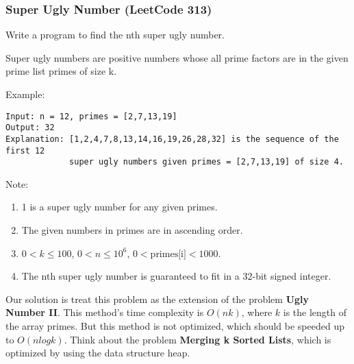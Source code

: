 \documentclass[11pt]{article}
\begin{document}
\subsubsection{Super Ugly Number (LeetCode 313)}
Write a program to find the nth super ugly number.

Super ugly numbers are positive numbers whose all prime factors are in the given prime list primes of size k.

Example:
\begin{verbatim}
Input: n = 12, primes = [2,7,13,19]
Output: 32 
Explanation: [1,2,4,7,8,13,14,16,19,26,28,32] is the sequence of the first 12 
             super ugly numbers given primes = [2,7,13,19] of size 4.
\end{verbatim}
Note:
\begin{enumerate}
	\item 1 is a super ugly number for any given primes.
	\item The given numbers in primes are in ascending order.
	\item $0 < k \leq 100$, $0 < n \leq 10^6$, $0 < \text{primes[i]} < 1000$.
	\item The nth super ugly number is guaranteed to fit in a 32-bit signed integer.
\end{enumerate}

Our solution is treat this problem as the extension of the problem \textbf{Ugly Number II}. 
This method's time complexity is $O(nk)$, where $k$ is the length of the array primes. 
But this method is not optimized, which should be speeded up to $O(n log k)$. 
Think about the problem \textbf{Merging k Sorted Lists}, which is optimized by using the data structure heap. 

\inputminted[breaklines=true,frame=leftline, linenos=true]{python}{src/nthSuperUglyNumber.py}
\end{document}
